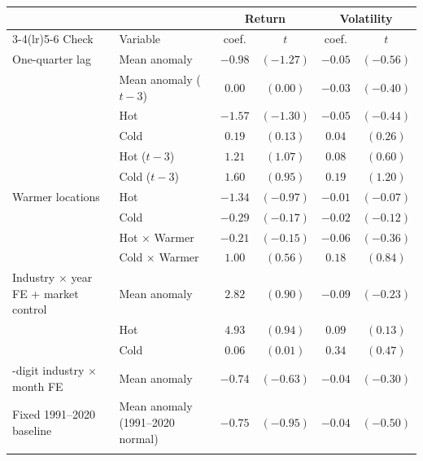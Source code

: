 \begin{tabular}{@{}llcccc@{}}
\toprule
 & & \multicolumn{2}{c}{Return} & \multicolumn{2}{c}{Volatility} \\
\cmidrule(lr){3-4}\cmidrule(lr){5-6}
Check & Variable & coef. & $t$ & coef. & $t$ \\
\midrule
One-quarter lag & Mean anomaly & $-0.98$ & $(-1.27)$ & $-0.05$ & $(-0.56)$ \\
 & Mean anomaly ($t-3$) & $0.00$ & $(0.00)$ & $-0.03$ & $(-0.40)$ \\
 & Hot & $-1.57$ & $(-1.30)$ & $-0.05$ & $(-0.44)$ \\
 & Cold & $0.19$ & $(0.13)$ & $0.04$ & $(0.26)$ \\
 & Hot ($t-3$) & $1.21$ & $(1.07)$ & $0.08$ & $(0.60)$ \\
 & Cold ($t-3$) & $1.60$ & $(0.95)$ & $0.19$ & $(1.20)$ \\
\addlinespace
Warmer locations & Hot & $-1.34$ & $(-0.97)$ & $-0.01$ & $(-0.07)$ \\
 & Cold & $-0.29$ & $(-0.17)$ & $-0.02$ & $(-0.12)$ \\
 & Hot $\times$ Warmer & $-0.21$ & $(-0.15)$ & $-0.06$ & $(-0.36)$ \\
 & Cold $\times$ Warmer & $1.00$ & $(0.56)$ & $0.18$ & $(0.84)$ \\
\addlinespace
Industry $\times$ year FE + market control & Mean anomaly & $2.82$ & $(0.90)$ & $-0.09$ & $(-0.23)$ \\
 & Hot & $4.93$ & $(0.94)$ & $0.09$ & $(0.13)$ \\
 & Cold & $0.06$ & $(0.01)$ & $0.34$ & $(0.47)$ \\
\addlinespace
2-digit industry $\times$ month FE & Mean anomaly & $-0.74$ & $(-0.63)$ & $-0.04$ & $(-0.30)$ \\
\addlinespace
Fixed 1991--2020 baseline & Mean anomaly (1991--2020 normal) & $-0.75$ & $(-0.95)$ & $-0.04$ & $(-0.50)$ \\
\addlinespace
\bottomrule
\end{tabular}
